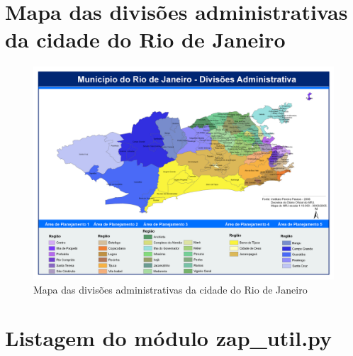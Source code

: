 \appendix

\chapter{Mapa das divisões administrativas da cidade do Rio de Janeiro}

\begin{figure}
	\includegraphics[width=1\linewidth]{img/rj_divisao_administrativa}
	\caption{Mapa das divisões administrativas da cidade do Rio de Janeiro}
	\label{fig:rj_divisao_administrativa}
\end{figure}


\chapter{Listagem do módulo  zap\_util.py}\label{ap:listagem_zap_util}




